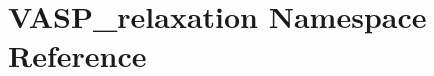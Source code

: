 \hypertarget{namespace_v_a_s_p__relaxation}{\section{V\+A\+S\+P\+\_\+relaxation Namespace Reference}
\label{namespace_v_a_s_p__relaxation}
}
